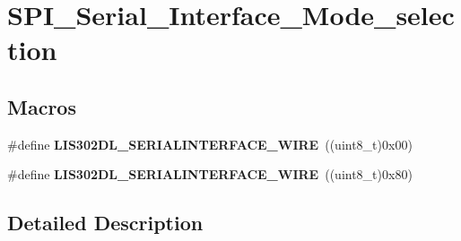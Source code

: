 \hypertarget{group___s_p_i___serial___interface___mode__selection}{\section{S\-P\-I\-\_\-\-Serial\-\_\-\-Interface\-\_\-\-Mode\-\_\-selection}
\label{group___s_p_i___serial___interface___mode__selection}
}
\subsection*{Macros}
\begin{DoxyCompactItemize}
\item 
\hypertarget{group___s_p_i___serial___interface___mode__selection_gab77e66e50e3a5f08f625d48c4262c27b}{\#define {\bfseries L\-I\-S302\-D\-L\-\_\-\-S\-E\-R\-I\-A\-L\-I\-N\-T\-E\-R\-F\-A\-C\-E\-\_\-W\-I\-R\-E}~((uint8\-\_\-t)0x00)}\label{group___s_p_i___serial___interface___mode__selection_gab77e66e50e3a5f08f625d48c4262c27b}

\item 
\hypertarget{group___s_p_i___serial___interface___mode__selection_ga8c843fa56263cfe9808fe12d2618cc07}{\#define {\bfseries L\-I\-S302\-D\-L\-\_\-\-S\-E\-R\-I\-A\-L\-I\-N\-T\-E\-R\-F\-A\-C\-E\-\_\-W\-I\-R\-E}~((uint8\-\_\-t)0x80)}\label{group___s_p_i___serial___interface___mode__selection_ga8c843fa56263cfe9808fe12d2618cc07}

\end{DoxyCompactItemize}


\subsection{Detailed Description}
